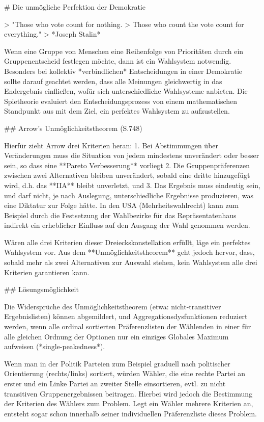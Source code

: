 # Die unmögliche Perfektion der Demokratie

> "Those who vote count for nothing.
> Those who count the vote count for everything."
> *Joseph Stalin*

Wenn eine Gruppe von Menschen eine Reihenfolge von Prioritäten durch ein Gruppenentscheid festlegen möchte, dann ist ein Wahlsystem notwendig.
Besonders bei kollektiv *verbindlichen* Entscheidungen in einer Demokratie sollte darauf geachtet werden, dass alle Meinungen gleichwertig in das Endergebnis einfließen, wofür sich unterschiedliche Wahlsysteme anbieten.
Die Spietheorie evaluiert den Entscheidungsprozess von einem mathematischen Standpunkt aus mit dem Ziel, ein perfektes Wahlsystem zu aufzustellen.

## Arrow's Unmöglichkeitstheorem (S.748)

Hierfür zieht Arrow drei Kriterien heran:
1. Bei Abstimmungen über Veränderungen muss die Situation von jedem mindestens unverändert oder besser sein, so dass eine **Pareto Verbesserung** vorliegt
2. Die Gruppenpräferenzen zwischen zwei Alternativen bleiben unverändert, sobald eine dritte hinzugefügt wird, d.h. das **IIA** bleibt unverletzt, und
3. Das Ergebnis muss eindeutig sein, und darf nicht, je nach Auslegung, unterschiedliche Ergebnisse produzieren, was eine Diktatur zur Folge hätte.
In den USA (Mehrheitswahlrecht) kann zum Beispiel durch die Festsetzung der Wahlbezirke für das Repräsentatenhaus indirekt ein erheblicher Einfluss auf den Ausgang der Wahl genommen werden.

Wären alle drei Kriterien dieser Dreieckskonstellation erfüllt, läge ein perfektes Wahlsystem vor.
Aus dem **Unmöglichkeitstheorem** geht jedoch hervor, dass, sobald mehr als zwei Alternativen zur Auswahl stehen, kein Wahlsystem alle drei Kriterien  garantieren kann.

## Lösungsmöglichkeit

Die Widersprüche des Unmöglichkeitstheorem (etwa: nicht-transitiver Ergebnislisten) können abgemildert, und Aggregationsdysfunktionen reduziert werden, wenn alle ordinal sortierten Präferenzlisten der Wählenden in einer für alle gleichen  Ordnung der Optionen nur ein einziges Globales Maximum aufweisen (*single-peakedness*).

Wenn man in der Politik Parteien zum Beispiel graduell nach politischer Orientierung (rechts/links) sortiert, würden Wähler, die eine rechte Partei an erster und ein Linke Partei an zweiter Stelle einsortieren, evtl. zu nicht transitiven Gruppenergebnissen beitragen.
Hierbei wird jedoch die Bestimmung der Kriterien des Wählers zum Problem.
Legt ein Wähler mehrere Kriterien an, entsteht sogar schon innerhalb seiner individuellen Präferenzliste dieses Problem.

